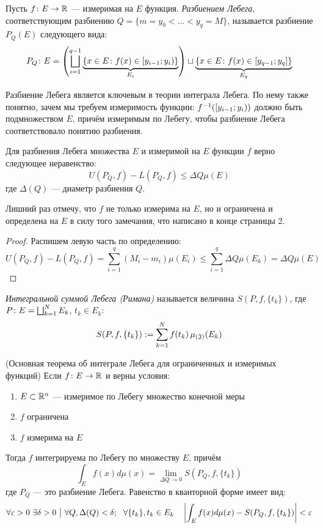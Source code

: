 \begin{definition}
	Пусть $f \colon E \to \mathbb{R}$ --- измеримая на $E$ функция. \textit{Разбиением Лебега}, соответствующим разбиению $Q = \{m = y_0 < \ldots < y_q = M\}$, называется разбиение $P_Q(E)$ следующего вида:
	\[
		P_Q \colon E = \left(\bigsqcup_{i = 1}^{q - 1} \underbrace{\{x \in E \colon f(x) \in \left[y_{i - 1}; y_i\right)\}}_{E_i}\right) \sqcup \underbrace{\{x \in E \colon f(x) \in [y_{q - 1}; y_q]\}}_{E_q}
	\]
\end{definition}

\begin{note}
	Разбиение Лебега является ключевым в теории интеграла Лебега. По нему также понятно, зачем мы требуем измеримость функции: $f^{-1}(\left[y_{i - 1}; y_i\right))$ должно быть подмножеством $E$, причём измеримым по Лебегу, чтобы разбиение Лебега соответствовало понятию разбиения.
\end{note}

\begin{proposition} \label{uminl-le-dqe}
	Для разбиения Лебега множества $E$ и измеримой на $E$ функции $f$ верно следующее неравенство:
	\[
		U(P_Q, f) - L(P_Q, f) \le \Delta Q \mu(E)
	\]
	где $\Delta(Q)$ --- диаметр разбиения $Q$.
\end{proposition}

\begin{anote}
	Лишний раз отмечу, что $f$ не только измерима на $E$, но и ограничена и определена на $E$ в силу того замечания, что написано в конце страницы 2.
\end{anote}

\begin{proof}
	Распишем левую часть по определению:
	\[
		U(P_Q, f) - L(P_Q, f) = \sum_{i = 1}^q (M_i - m_i)\mu(E_i) \le \sum_{i = 1}^q \Delta Q\mu(E_k) = \Delta Q \mu(E)
	\]
\end{proof}

\begin{definition}
	\textit{Интегральной суммой Лебега (Римана)} называется величина $S(P, f, \{t_k\})$, где $P \colon E = \bigsqcup_{k = 1}^N E_k$, $t_k \in E_k$:
	\[
		S(P, f, \{t_k\}) := \sum_{k = 1}^N f(t_k) \operatorname{\mu_{(\mathfrak{J})}}(E_k)
	\]
\end{definition}

\begin{theorem} (Основная теорема об интеграле Лебега для ограниченных и измеримых функций)
	Если $f \colon E \to \mathbb{R}$ и верны условия:
	\begin{enumerate}
		\item $E \subset \mathbb{R}^n$ --- измеримое по Лебегу множество конечной меры
		
		\item $f$ ограничена
		
		\item $f$ измерима на $E$
	\end{enumerate}
	Тогда $f$ интегрируема по Лебегу по множеству $E$, причём
	\[
		\int_E f(x)d\mu(x) = \lim_{\Delta Q \to 0} S(P_Q, f, \{t_k\})
	\]
	где $P_Q$ --- это разбиение Лебега. Равенство в кванторной форме имеет вид:
	\[
		\forall \varepsilon > 0\ \exists \delta > 0 \ \big|\  \forall Q, \Delta(Q) < \delta;\ \ \forall \{t_k\}, t_k \in E_k \quad \left|\int_E f(x)d\mu(x) - S(P_Q, f, \{t_k\})\right| < \varepsilon
	\]
\end{theorem}

